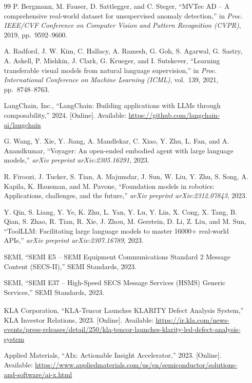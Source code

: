 \documentclass[conference]{IEEEtran}
\begin{document}
\begin{thebibliography}{99}
P. Bergmann, M. Fauser, D. Sattlegger, and C. Steger, ``MVTec AD -- A comprehensive real-world dataset for unsupervised anomaly detection,'' in \textit{Proc. IEEE/CVF Conference on Computer Vision and Pattern Recognition (CVPR)}, 2019, pp.~9592--9600.

A. Radford, J. W. Kim, C. Hallacy, A. Ramesh, G. Goh, S. Agarwal, G. Sastry, A. Askell, P. Mishkin, J. Clark, G. Krueger, and I. Sutskever, ``Learning transferable visual models from natural language supervision,'' in \textit{Proc. International Conference on Machine Learning (ICML)}, vol.~139, 2021, pp.~8748--8763.

LangChain, Inc., ``LangChain: Building applications with LLMs through composability,'' 2024. [Online]. Available: \url{https://github.com/langchain-ai/langchain}

G. Wang, Y. Xie, Y. Jiang, A. Mandlekar, C. Xiao, Y. Zhu, L. Fan, and A. Anandkumar, ``Voyager: An open-ended embodied agent with large language models,'' \textit{arXiv preprint arXiv:2305.16291}, 2023.

R. Firoozi, J. Tucker, S. Tian, A. Majumdar, J. Sun, W. Liu, Y. Zhu, S. Song, A. Kapila, K. Hausman, and M. Pavone, ``Foundation models in robotics: Applications, challenges, and the future,'' \textit{arXiv preprint arXiv:2312.07843}, 2023.

Y. Qin, S. Liang, Y. Ye, K. Zhu, L. Yan, Y. Lu, Y. Lin, X. Cong, X. Tang, B. Qian, S. Zhao, R. Tian, R. Xie, J. Zhou, M. Gerstein, D. Li, Z. Liu, and M. Sun, ``ToolLLM: Facilitating large language models to master 16000+ real-world APIs,'' \textit{arXiv preprint arXiv:2307.16789}, 2023.

SEMI, ``SEMI E5 -- SEMI Equipment Communications Standard 2 Message Content (SECS-II),'' SEMI Standards, 2023.

SEMI, ``SEMI E37 -- High-Speed SECS Message Services (HSMS) Generic Services,'' SEMI Standards, 2023.

KLA Corporation, ``KLA-Tencor Launches KLARITY\textsuperscript{\textregistered} Defect Analysis System,'' KLA Investor Relations, 2023. [Online]. Available: \url{https://ir.kla.com/news-events/press-releases/detail/250/kla-tencor-launches-klarity-led-defect-analysis-system}

Applied Materials, ``AIx: Actionable Insight Accelerator,'' 2023. [Online]. Available: \url{https://www.appliedmaterials.com/us/en/semiconductor/solutions-and-software/ai-x.html}


\end{thebibliography}
\end{document}
